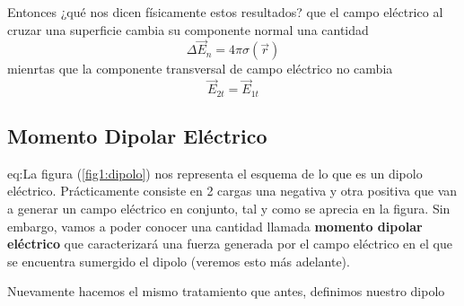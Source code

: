 \documentclass[11pt,a4paper]{article}
\begin{document}
Entonces ¿qué nos dicen físicamente estos resultados? que el campo eléctrico al cruzar una superficie cambia su componente normal una cantidad 
\begin{equation}\label{eq:frenselNormal}
\Delta\vec{E}_n=4\pi\sigma(\vec{r})
\end{equation}
mienrtas que la componente transversal de campo eléctrico no cambia
\begin{equation}\label{eq:fresnelTransversal}
\vec{E}_{2t}=\vec{E}_{1t}
\end{equation}

\newpage
\subsection{Momento Dipolar Eléctrico}
eq:La figura (\ref{fig1:dipolo}) nos representa el esquema de lo que es un dipolo eléctrico. Prácticamente consiste en 2 cargas una negativa y otra positiva que van a generar un campo eléctrico en conjunto, tal y como se aprecia en la figura. Sin embargo, vamos a poder conocer una cantidad llamada \textbf{momento dipolar eléctrico} que caracterizará una fuerza generada por el campo eléctrico en el que se encuentra sumergido el dipolo (veremos esto más adelante).

Nuevamente hacemos el mismo tratamiento que antes, definimos nuestro dipolo
\end{document}
